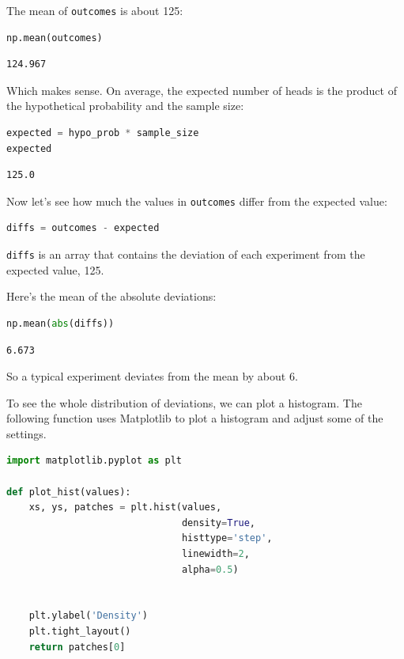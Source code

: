 The mean of \passthrough{\lstinline!outcomes!} is about 125:

\begin{lstlisting}[language=Python]
np.mean(outcomes)
\end{lstlisting}

\begin{lstlisting}[]
124.967
\end{lstlisting}

Which makes sense. On average, the expected number of heads is the
product of the hypothetical probability and the sample size:

\begin{lstlisting}[language=Python]
expected = hypo_prob * sample_size
expected
\end{lstlisting}

\begin{lstlisting}[]
125.0
\end{lstlisting}

Now let's see how much the values in \passthrough{\lstinline!outcomes!}
differ from the expected value:

\begin{lstlisting}[language=Python]
diffs = outcomes - expected
\end{lstlisting}

\passthrough{\lstinline!diffs!} is an array that contains the deviation
of each experiment from the expected value, 125.

Here's the mean of the absolute deviations:

\begin{lstlisting}[language=Python]
np.mean(abs(diffs))
\end{lstlisting}

\begin{lstlisting}[]
6.673
\end{lstlisting}

So a typical experiment deviates from the mean by about 6.

To see the whole distribution of deviations, we can plot a histogram.
The following function uses Matplotlib to plot a histogram and adjust
some of the settings.

\begin{lstlisting}[language=Python]
import matplotlib.pyplot as plt

def plot_hist(values):
    xs, ys, patches = plt.hist(values,
                               density=True,
                               histtype='step',
                               linewidth=2,
                               alpha=0.5)
    
    
    plt.ylabel('Density')
    plt.tight_layout()
    return patches[0]
\end{lstlisting}

